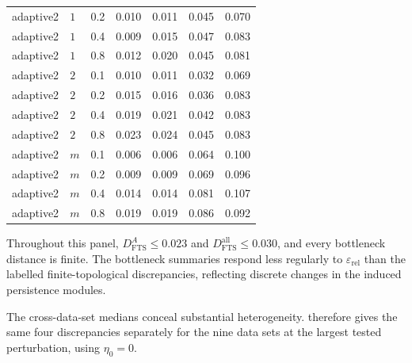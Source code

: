 \documentclass[a4paper,11pt]{article}
\theoremstyle{definition}
\theoremstyle{remark}
\begin{document}
\begin{table}[!ht]
\begin{tabular}{llcrrrr}
adaptive2 & $1$ & 0.2 & 0.010 & 0.011 & 0.045 & 0.070 \\
adaptive2 & $1$ & 0.4 & 0.009 & 0.015 & 0.047 & 0.083 \\
adaptive2 & $1$ & 0.8 & 0.012 & 0.020 & 0.045 & 0.081 \\
adaptive2 & $2$ & 0.1 & 0.010 & 0.011 & 0.032 & 0.069 \\
adaptive2 & $2$ & 0.2 & 0.015 & 0.016 & 0.036 & 0.083 \\
adaptive2 & $2$ & 0.4 & 0.019 & 0.021 & 0.042 & 0.083 \\
adaptive2 & $2$ & 0.8 & 0.023 & 0.024 & 0.045 & 0.083 \\
adaptive2 & $m$ & 0.1 & 0.006 & 0.006 & 0.064 & 0.100 \\
adaptive2 & $m$ & 0.2 & 0.009 & 0.009 & 0.069 & 0.096 \\
adaptive2 & $m$ & 0.4 & 0.014 & 0.014 & 0.081 & 0.107 \\
adaptive2 & $m$ & 0.8 & 0.019 & 0.019 & 0.086 & 0.092 \\
\bottomrule
\end{tabular}
\end{table}

Throughout this panel, $D_{\mathrm{FTS}}^A\leq0.023$ and $D_{\mathrm{FTS}}^{\mathrm{all}}\leq0.030$, and every bottleneck distance is finite. The bottleneck summaries respond less regularly to $\varepsilon_{\mathrm{rel}}$ than the labelled finite-topological discrepancies, reflecting discrete changes in the induced persistence modules.

The cross-data-set medians conceal substantial heterogeneity.  therefore gives the same four discrepancies separately for the nine data sets at the largest tested perturbation, using $\eta_0=0$.
\end{document}
